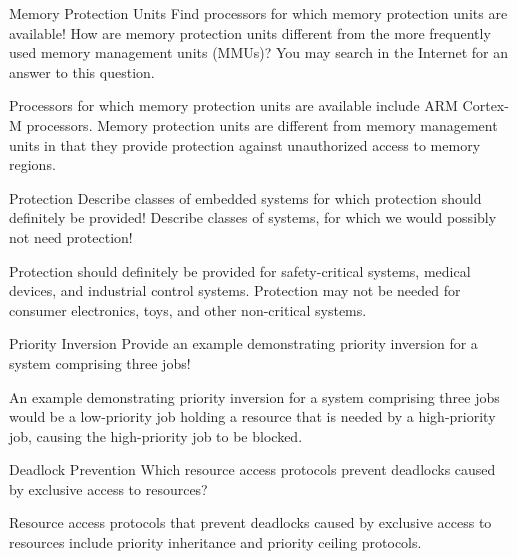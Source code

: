 \documentclass{article}
\begin{document}
\begin{exercise}{Memory Protection Units}
  Find processors for which memory protection units are available! How are memory protection units different from the more frequently used memory management units (MMUs)? You may search in the Internet for an answer to this question.

  \begin{solution}
    Processors for which memory protection units are available include ARM Cortex-M processors. Memory protection units are different from memory management units in that they provide protection against unauthorized access to memory regions.
  \end{solution}
\end{exercise}

\begin{exercise}{Protection}
  Describe classes of embedded systems for which protection should definitely be provided! Describe classes of systems, for which we would possibly not need protection!

  \begin{solution}
    Protection should definitely be provided for safety-critical systems, medical devices, and industrial control systems. Protection may not be needed for consumer electronics, toys, and other non-critical systems.
  \end{solution}
\end{exercise}

\begin{exercise}{Priority Inversion}
  Provide an example demonstrating priority inversion for a system comprising three jobs!

  \begin{solution}
    An example demonstrating priority inversion for a system comprising three jobs would be a low-priority job holding a resource that is needed by a high-priority job, causing the high-priority job to be blocked.
  \end{solution}
\end{exercise}

\begin{exercise}{Deadlock Prevention}
  Which resource access protocols prevent deadlocks caused by exclusive access to resources?

  \begin{solution}
    Resource access protocols that prevent deadlocks caused by exclusive access to resources include priority inheritance and priority ceiling protocols.
  \end{solution}
\end{exercise}
\end{document}
